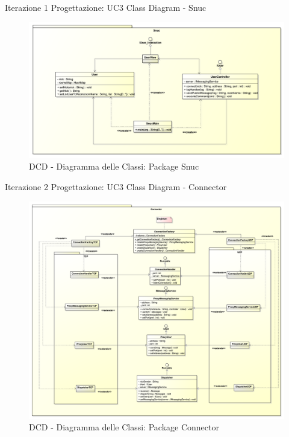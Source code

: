 \documentclass[t]{beamer} %
\begin{document}
\begin{frame} {Iterazione 1 Progettazione: UC3 Class Diagram - Snuc}
   \begin{figure}
     \includegraphics[scale=0.24]{image_astah/Iteration_2_DesignModel/ClassDiagramSnuc.png}{\centering}
     \caption{DCD - Diagramma delle Classi: Package Snuc }
     \label{fig_UC3_DCD_3} 
   \end{figure}
\end{frame}

\begin{frame} {Iterazione 2 Progettazione: UC3 Class Diagram - Connector}
   \begin{figure}
     \includegraphics[scale=0.125]{image_astah/Iteration_2_DesignModel/ClassDiagramConnector.png}{\centering}
     \caption{DCD - Diagramma delle Classi: Package Connector }
     \label{fig_UC3_DCD_4} 
   \end{figure}
\end{frame}
\end{document}
